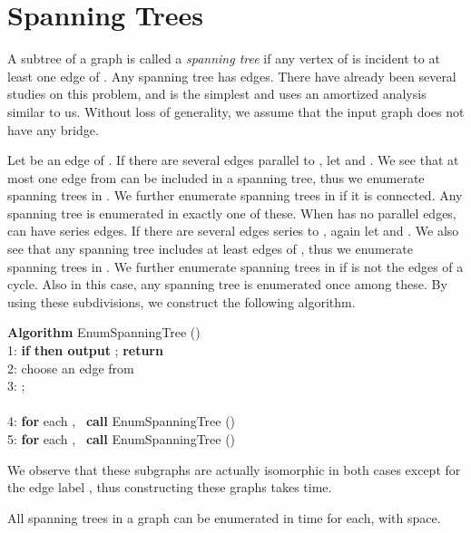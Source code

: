 \documentclass{llncs}
\begin{document}
\vspace{-2mm}
\section{Spanning Trees}\label{sec:sptree}
\vspace{-2mm}

A subtree  of a graph  is called a {\em spanning tree} if any 
 vertex of  is incident to at least one edge of .
Any spanning tree has  edges.
There have already been several studies on this
 problem\cite{KpRm95,SrTmUn97,Un99}, and \cite{Un99} is the simplest
 and uses an amortized analysis similar to us.
Without loss of generality, we assume that the input graph does not
 have any bridge.

Let  be an edge of .
If there are several edges  parallel to ,
 let  and .
We see that at most one edge from  can be included in a spanning tree, 
 thus we enumerate spanning trees in .
We further enumerate spanning trees in  if it is connected.
Any spanning tree is enumerated in exactly one of these.
When  has no parallel edges,  can have series edges.
If there are several edges  series to , again
 let  and .
We also see that any spanning tree includes at least  edges of ,
 thus we enumerate spanning trees in .
We further enumerate spanning trees in  if  is not the edges of
 a cycle.
Also in this case, any spanning tree is enumerated once among these.
By using these subdivisions, we construct the following algorithm.

\begin{tabbing}
{\bf Algorithm} EnumSpanningTree ()\\
1: {\bf if}  {\bf then output} ; {\bf return}\\ 
2: choose an edge  from \\
3:  ;\\ 
\ \ \ \ \ \\
4: {\bf for} each , \ {\bf call} EnumSpanningTree
 ()\\
5: {\bf for} each , \ {\bf call} EnumSpanningTree
 ()
\end{tabbing}

\noindent
We observe that these  subgraphs are actually isomorphic
 in both cases except for the edge label , thus constructing
 these graphs takes  time.


\begin{theorem}\label{spantree}
All spanning trees in a graph can be enumerated in  time
 for each, with  space.
\end{theorem}
\end{document}
